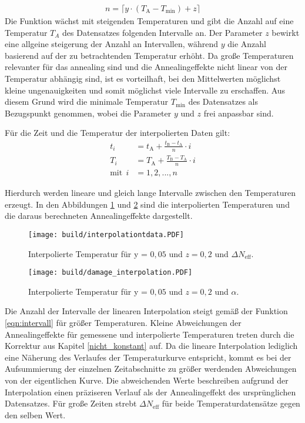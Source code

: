 \begin{align*}
  n = \lceil{y \cdot (T_{\mathrm{A}}-T_{\mathrm{min}})+ z}\rceil \label{eqn:intervall}
\end{align*}
Die Funktion wächst mit steigenden Temperaturen und gibt die Anzahl auf eine Temperatur $T_A$ des
Datensatzes folgenden Intervalle an. Der Parameter $z$ bewirkt eine allgeine steigerung
der Anzahl an Intervallen, während $y$ die Anzahl basierend auf der zu betrachtenden Temperatur
erhöht.
Da große Temperaturen relevanter für das annealing sind und die Annealingeffekte nicht linear von
der Temperatur abhängig sind, ist es vorteilhaft,
bei den Mittelwerten möglichst kleine ungenauigkeiten und somit möglichst viele
Intervalle zu erschaffen. Aus diesem Grund wird die minimale Temperatur $T_{\mathrm{min}}$ des Datensatzes
als Bezugspunkt genommen, wobei die Parameter $y$ und $z$ frei anpassbar sind.

Für die Zeit und die Temperatur der interpolierten Daten gilt:
\begin{align}
  t_i &= t_{\mathrm{A}} +  \frac{t_{\mathrm{B}}-t_{\mathrm{A}}}{n} \cdot i \\
  T_i &= T_{\mathrm{A}} +  \frac{T_{\mathrm{B}}-T_{\mathrm{A}}}{n} \cdot i \\
  \text{mit}\:\:i &= 1, 2, ..., n
\end{align}

Hierdurch werden lineare und gleich lange Intervalle zwischen den Temperaturen
erzeugt. In den Abbildungen \ref{fig:interpolation_N_eff} und \ref{fig:interpolation_damage} sind die interpolierten Temperaturen und
die daraus berechneten Annealingeffekte dargestellt.

\begin{figure}
    \texttt{[image: build/interpolationtdata.PDF]}
\caption{Interpolierte Temperatur für y = $0,05$ und $z=0,2$ und $\Delta N_{\mathrm{eff}}$.}
\label{fig:interpolation_N_eff}
\end{figure}



\begin{figure}
    \texttt{[image: build/damage\_interpolation.PDF]}
\caption{Interpolierte Temperatur für y = $0,05$ und $z=0,2$ und $\alpha$.}
\label{fig:interpolation_damage}
\end{figure}

Die Anzahl der Intervalle der linearen Interpolation steigt gemäß der Funktion \ref{eqn:intervall}
für größer Temperaturen. Kleine Abweichungen der Annealingeffekte für gemessene und
interpolierte Temperaturen treten durch die Korrektur aus Kapitel \ref{nicht_konstant}
auf. Da die lineare Interpolation lediglich eine Näherung des Verlaufes der
Temperaturkurve entspricht, kommt es bei der Aufsummierung der einzelnen Zeitabschnitte
zu größer werdenden Abweichungen von der eigentlichen Kurve. Die abweichenden Werte beschreiben
aufgrund der Interpolation einen präziseren Verlauf als der Annealingeffekt des ursprünglichen Datensatzes.
Für große Zeiten strebt $\Delta N_{\mathrm{eff}}$
für beide Temperaturdatensätze gegen den selben Wert.

